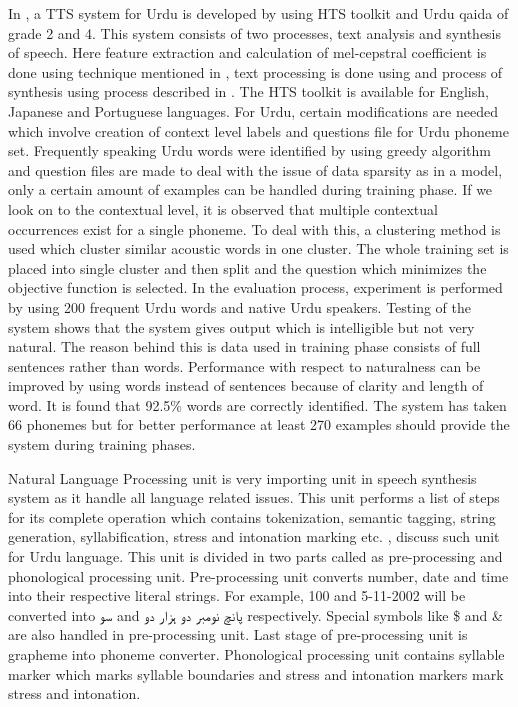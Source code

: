 In \cite{nawaz2014hidden}, a TTS system for Urdu is developed by using HTS toolkit and Urdu qaida of grade 2 and 4. This system consists of two processes, text analysis and synthesis of speech. Here feature extraction and calculation of mel-cepstral coefficient is done using technique mentioned in \cite{fukada1992adaptive}, text processing is done using \cite{kabir2002natural} and process of synthesis using process described in \cite{tokuda2000speech}. The HTS toolkit is available for English, Japanese and Portuguese languages. For Urdu, certain modifications are needed which involve creation of context level labels and questions file for Urdu phoneme set. Frequently speaking Urdu words were identified by using greedy algorithm and question files are made to deal with the issue of data sparsity as in a model, only a certain amount of examples can be handled during training phase. If we look on to the contextual level, it is observed that multiple contextual occurrences exist for a single phoneme. To deal with this, a clustering method is used which cluster similar acoustic words in one cluster. The whole training set is placed into single cluster and then split and the question which minimizes the objective function is selected. In the evaluation process, experiment is performed by using 200 frequent Urdu words and native Urdu speakers. Testing of the system shows that the system gives output which is intelligible but not very natural. The reason behind this is data used in training phase consists of full sentences rather than words. Performance with respect to naturalness can be improved by using words instead of sentences because of clarity and length of word. It is found that 92.5\% words are correctly identified. The system has taken 66 phonemes but for better performance at least 270 examples should provide the system during training phases.

Natural Language Processing unit is very importing unit in speech synthesis system as it handle all language related issues. This unit performs a list of steps for its complete operation which contains tokenization, semantic tagging, string generation, syllabification, stress and intonation marking etc. \cite{saleem2002urdu}, \cite{urdu_text_preprocessing} discuss such unit for Urdu language. This unit is divided in two parts called as pre-processing and phonological processing unit. Pre-processing unit converts number, date and time into their respective literal strings. For example, 100 and 5-11-2002 will be converted into \texturdu{سو} and \texturdu{پانچ نومبر دو ہزار دو} respectively. Special symbols like \$ and & are also handled in pre-processing unit. Last stage of pre-processing unit is grapheme into phoneme converter. Phonological processing unit contains syllable marker which marks syllable boundaries and stress and intonation markers mark stress and intonation.

